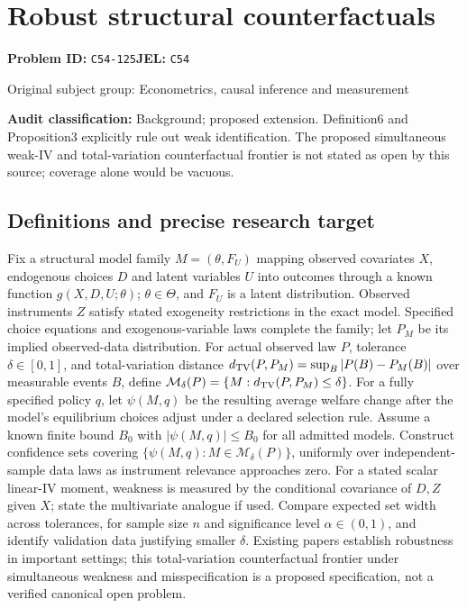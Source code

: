 \documentclass[11pt,a4paper]{article}
\begin{document}
\section*{Robust structural counterfactuals}
\textbf{Problem ID:} \texttt{C54-125}\quad \textbf{JEL:} \texttt{C54}\par
\label{problem:OP-0426}
{\sffamily\small\color{muted}Original subject group: Econometrics, causal inference and measurement\par}
\label{definitions:problem:30007708}
\textbf{Audit classification:} Background; proposed extension. Definition6 and Proposition3 explicitly rule out weak identification. The proposed simultaneous weak-IV and total-variation counterfactual frontier is not stated as open by this source; coverage alone would be vacuous.
\subsection*{Definitions and precise research target}
Fix a structural model family \(M=(\theta,F_U)\) mapping observed covariates \(X\), endogenous choices \(D\) and latent variables \(U\) into outcomes through a known function \(g(X,D,U;\theta)\); \(\theta\in\Theta\), and \(F_U\) is a latent distribution. Observed instruments \(Z\) satisfy stated exogeneity restrictions in the exact model. Specified choice equations and exogenous-variable laws complete the family; let \(P_M\) be its implied observed-data distribution. For actual observed law \(P\), tolerance \(\delta\in[0,1]\), and total-variation distance \(d_{\rm TV}(P,P_M)=\sup_B|P(B)-P_M(B)|\) over measurable events \(B\), define \(\mathcal M_\delta(P)=\{M:d_{\rm TV}(P,P_M)\leq\delta\}\). For a fully specified policy \(q\), let \(\psi(M,q)\) be the resulting average welfare change after the model's equilibrium choices adjust under a declared selection rule. Assume a known finite bound \(B_0\) with \(|\psi(M,q)|\leq B_0\) for all admitted models. Construct confidence sets covering \(\{\psi(M,q):M\in\mathcal M_\delta(P)\}\), uniformly over independent-sample data laws as instrument relevance approaches zero. For a stated scalar linear-IV moment, weakness is measured by the conditional covariance of \(D,Z\) given \(X\); state the multivariate analogue if used. Compare expected set width across tolerances, for sample size \(n\) and significance level \(\alpha\in(0,1)\), and identify validation data justifying smaller \(\delta\). Existing papers establish robustness in important settings; this total-variation counterfactual frontier under simultaneous weakness and misspecification is a proposed specification, not a verified canonical open problem.
\end{document}
